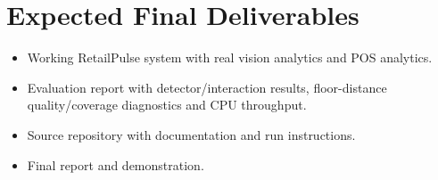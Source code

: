 \section{Expected Final Deliverables}
\begin{itemize}
\item Working RetailPulse system with real vision analytics and POS analytics.
\item Evaluation report with detector/interaction results, floor-distance quality/coverage diagnostics and CPU throughput.
\item Source repository with documentation and run instructions.
\item Final report and demonstration.
\end{itemize}
